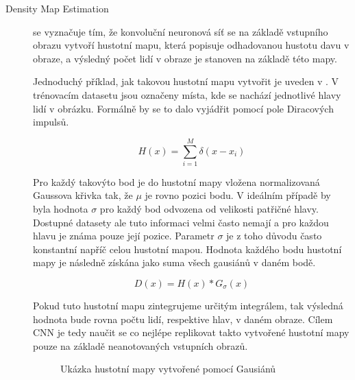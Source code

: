 \begin{description}
\item[Density Map Estimation] se vyznačuje tím, že konvoluční neuronová síť se na základě vstupního obrazu vytvoří hustotní mapu, která popisuje odhadovanou hustotu davu v obraze, a výsledný počet lidí v obraze je stanoven na základě této mapy.

Jednoduchý příklad, jak takovou hustotní mapu vytvořit je uveden v \cite{DeepCorn, Boominathan}.
V trénovacím datasetu jsou označeny místa, kde se nachází jednotlivé hlavy lidí v obrázku.
Formálně by se to dalo vyjádřit pomocí pole Diracových impulsů.

\begin{equation}
H(x) = \sum_{i=1}^{M} \delta(x-x_i)
\label{eq:density_map}
\end{equation}


Pro každý takovýto bod je do hustotní mapy vložena normalizovaná Gaussova křivka tak, že \(\mu\) je rovno pozici bodu.
V ideálním případě by byla hodnota \(\sigma\) pro každý bod odvozena od velikosti patřičné hlavy.
Dostupné datasety ale tuto informaci velmi často nemají a pro každou hlavu je známa pouze její pozice.
Parametr \(\sigma\) je z toho důvodu často konstantní napříč celou hustotní mapou.
Hodnota každého bodu hustotní mapy je následně získána jako suma všech gausiánů v daném bodě.

\begin{equation}
D(x) = H(x) * G_{\sigma}(x)
\label{eq:density_map}
\end{equation}

Pokud tuto hustotní mapu zintegrujeme určitým integrálem, tak výsledná hodnota bude rovna počtu lidí, respektive hlav, v daném obraze.
Cílem CNN je tedy naučit se co nejlépe replikovat takto vytvořené hustotní mapy pouze na základě neanotovaných vstupních obrazů.

\begin{figure}[h!]
	\centering
	\caption{Ukázka hustotní mapy vytvořené pomocí Gausiánů}
\end{figure}


\end{description}
